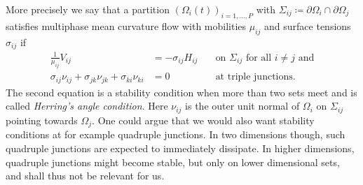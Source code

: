 More precisely we say that a partition $ ( \Omega_{ i } ( t ) )_{ i = 1 , 
\dotsc , P } $ with 
$ \Sigma_{ i j } \coloneqq \partial \Omega_{ i } \cap \partial \Omega_{ j } $ 
satisfies multiphase mean curvature flow with mobilities $ \mu_{ i j } $ and 
surface 
tensions $ \sigma_{ i j } $ if 
\begin{align}
		\label{v_is_equal_to_h}
		\frac{ 1 }{ \mu_{ i j } }
		V_{ i j }
		& =
		-
		\sigma_{ i  j }
		H_{ i j }
		\quad
		&\text{on } \Sigma_{i j }\text{ for all }i\neq j \text{ and}
		\\
		\label{herrings_angle_condition}
			\sigma_{ i j }
			\nu_{ i j }
			+
			\sigma_{ j k }
			\nu_{ j k }
			+
			\sigma_{ k i }
			\nu_{ k i }
		& =
		0
		& \text{at triple junctions}.
\end{align}
The second equation is a stability condition when more than two sets meet and is
called \emph{Herring's angle condition}. Here $ \nu_{ i j } $ is the outer unit 
normal of $ \Omega_{ i } $
on $ \Sigma_{ i j } $ pointing towards $ \Omega_{ j } $. 
One could argue that we would also want stability conditions at for example 
quadruple 
junctions. In two dimensions though, such quadruple junctions are expected to 
immediately dissipate. In higher dimensions, quadruple junctions might become 
stable, but only on lower dimensional sets, and shall thus not be relevant for 
us.

